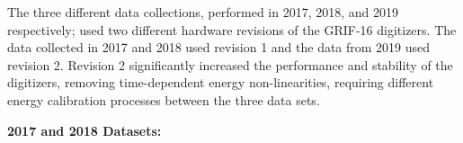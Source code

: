 \documentclass[cnatzke_thesis_proposal.tex]{subfiles}
\begin{document}
The three different data collections, performed in 2017, 2018, and 2019 respectively; used two different hardware revisions of the GRIF-16 digitizers. 
The data collected in 2017 and 2018 used revision 1 and the data from 2019 used revision 2. 
Revision 2 significantly increased the performance and stability of the digitizers, removing time-dependent energy non-linearities, requiring different energy calibration processes between the three data sets. 

\textbf{2017 and 2018 Datasets:} 




\end{document}
